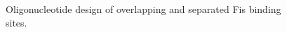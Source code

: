 \documentclass[doublespacing]{narfront}
\begin{document}
\begin{figure}[ht] %
\caption{Oligonucleotide design of overlapping and separated Fis binding sites.}

\end{figure}
\end{document}
